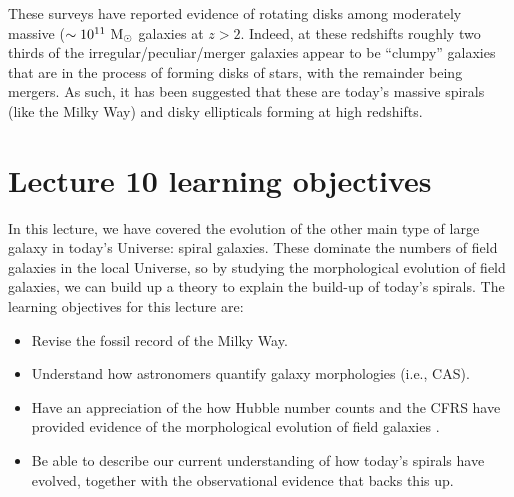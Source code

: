 \documentclass[11pt]{article}
\begin{document}
These surveys have reported evidence of rotating disks among
moderately massive ($\sim10^{11}~{\rm M_\odot}$ galaxies at
$z>2$. Indeed, at these redshifts roughly two thirds of the
irregular/peculiar/merger galaxies appear to be ``clumpy'' galaxies
that are in the process of forming disks of stars, with the remainder
being mergers. As such, it has been suggested that these are today's
massive spirals (like the Milky Way) and disky ellipticals forming at
high redshifts.

\section{Lecture 10 learning objectives}
In this lecture, we have covered the evolution of the other main type
of large galaxy in today's Universe: spiral galaxies. These dominate
the numbers of field galaxies in the local Universe, so by studying
the morphological evolution of field galaxies, we can build up a
theory to explain the build-up of today's spirals. The learning
objectives for this lecture are:
\begin{itemize}
\item Revise the fossil record of the Milky Way.
\item Understand how astronomers quantify galaxy morphologies (i.e., CAS).
\item Have an appreciation of the how Hubble number counts and the
  CFRS have provided evidence of the morphological evolution of field galaxies .
\item Be able to describe our current understanding of how today's
  spirals have evolved, together with the observational evidence that
  backs this up.
\end{itemize}
\end{document}
